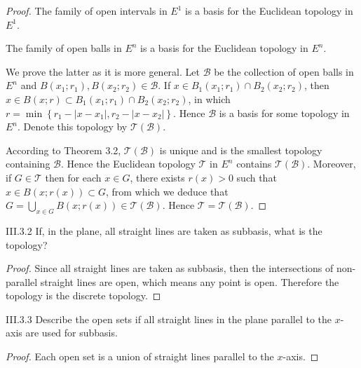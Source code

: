\begin{proof}
	The family of open intervals in \( E^{1} \) is a basis for the Euclidean topology in \( E^{1} \).

	The family of open balls in \( E^{n} \) is a basis for the Euclidean topology in \( E^{n} \).

	We prove the latter as it is more general. Let \( \mathscr{B} \) be the collection of open balls in \( E^{n} \) and \( B(x_{1}; r_{1}), B(x_{2}; r_{2}) \in \mathscr{B} \). If \( x \in B_{1}(x_{1}; r_{1}) \cap B_{2}(x_{2}; r_{2}) \), then \( x \in B(x; r) \subset B_{1}(x_{1}; r_{1}) \cap B_{2}(x_{2}; r_{2}) \), in which \( r = \min\left\{ r_{1} - \left\vert x - x_{1} \right\vert, r_{2} - \left\vert x - x_{2} \right\vert \right\} \). Hence \( \mathscr{B} \) is a basis for some topology in \( E^{n} \). Denote this topology by \( \mathscr{T}(\mathscr{B}) \).

	According to Theorem 3.2, \( \mathscr{T}(\mathscr{B}) \) is unique and is the smallest topology containing \( \mathscr{B} \). Hence the Euclidean topology \( \mathscr{T} \) in \( E^{n} \) contains \( \mathscr{T}(\mathscr{B}) \). Moreover, if \( G \in \mathscr{T} \) then for each \( x \in G \), there exists \( r(x) > 0 \) such that \( x \in B(x; r(x)) \subset G \), from which we deduce that \( G = \bigcup_{x\in G} B(x; r(x)) \in \mathscr{T}(\mathscr{B}) \). Hence \( \mathscr{T} = \mathscr{T}(\mathscr{B}) \).
\end{proof}

\begin{problem}{III.3.2}
If, in the plane, all straight lines are taken as subbasis, what is the topology?
\end{problem}

\begin{proof}
	Since all straight lines are taken as subbasis, then the intersections of non-parallel straight lines are open, which means any point is open. Therefore the topology is the discrete topology.
\end{proof}

\begin{problem}{III.3.3}
Describe the open sets if all straight lines in the plane parallel to the \(x\)-axis are used for subbasis.
\end{problem}

\begin{proof}
	Each open set is a union of straight lines parallel to the \(x\)-axis.
\end{proof}

